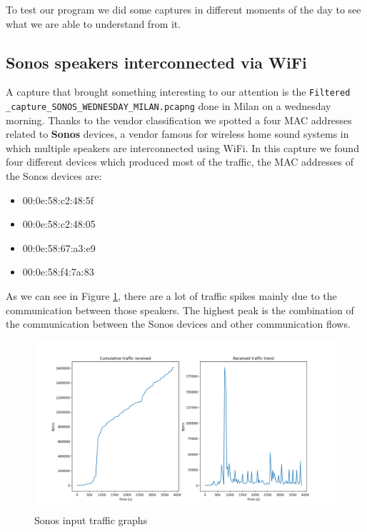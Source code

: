 
To test our program we did some captures in different moments of the day to see what we are able to 
understand from it.
\subsection{Sonos speakers interconnected via WiFi}
 A capture that brought something interesting to our attention is the \texttt{Filtered
\_capture\_SONOS\_WEDNESDAY\_MILAN.pcapng} done in Milan on a wednesday morning. Thanks to the vendor 
classification we spotted a four MAC addresses related to \textbf{Sonos} devices, a vendor famous for
wireless home sound systems in which multiple speakers are interconnected using WiFi. In this capture 
we found four different devices which produced most of the traffic, the MAC addresses of the Sonos 
devices are:
\begin{itemize}
    \item 00:0e:58:c2:48:5f
    \item 00:0e:58:c2:48:05
    \item 00:0e:58:67:a3:e9
    \item 00:0e:58:f4:7a:83
\end{itemize}
As we can see in Figure \ref{fig:Sonos_traffic}, there are a lot of traffic spikes mainly due to the
communication between those speakers. The highest peak is the combination of the communication between
the Sonos devices and other communication flows.
\begin{figure}[h]
    \includegraphics[width=\textwidth]{Graphs/SONOS_cum_in_traffic.png}
    \caption{Sonos input traffic graphs}
    \label{fig:Sonos_traffic}
\end{figure}
